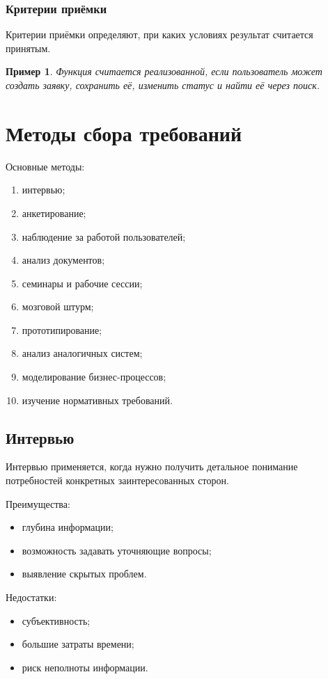 \documentclass[12pt,a4paper]{article}
\newtheorem{example}{Пример}
\begin{document}
\subsubsection{Критерии приёмки}

Критерии приёмки определяют, при каких условиях результат считается принятым.

\begin{example}
Функция считается реализованной, если пользователь может создать заявку, сохранить её, изменить статус и найти её через поиск.
\end{example}

\section{Методы сбора требований}

Основные методы:
\begin{enumerate}
    \item интервью;
    \item анкетирование;
    \item наблюдение за работой пользователей;
    \item анализ документов;
    \item семинары и рабочие сессии;
    \item мозговой штурм;
    \item прототипирование;
    \item анализ аналогичных систем;
    \item моделирование бизнес-процессов;
    \item изучение нормативных требований.
\end{enumerate}

\subsection{Интервью}

Интервью применяется, когда нужно получить детальное понимание потребностей конкретных заинтересованных сторон.

Преимущества:
\begin{itemize}
    \item глубина информации;
    \item возможность задавать уточняющие вопросы;
    \item выявление скрытых проблем.
\end{itemize}

Недостатки:
\begin{itemize}
    \item субъективность;
    \item большие затраты времени;
    \item риск неполноты информации.
\end{itemize}
\end{document}

